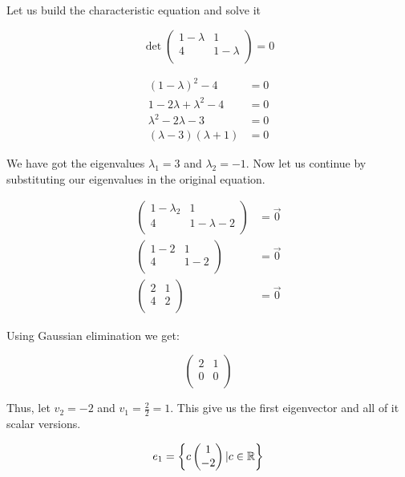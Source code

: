 Let us build the characteristic equation and solve it

\[
    \det 
    \begin{pmatrix}
        1 - \lambda & 1 \\
        4 & 1 - \lambda \\
    \end{pmatrix}
    = 0
\]

\begin{align*}
    (1 - \lambda)^2 - 4 &= 0 \\
    1 - 2\lambda + \lambda^2 - 4 &= 0 \\
    \lambda^2 - 2\lambda - 3 &= 0 \\
    (\lambda - 3) (\lambda + 1) &= 0 
\end{align*}

We have got the eigenvalues \(\lambda_1 = 3\) and \(\lambda_2 = -1\). Now let us continue by 
substituting our eigenvalues in the original equation.

\begin{align*}
    \begin{pmatrix} 1 - \lambda_2 & 1 \\ 4 & 1 - \lambda-2 \\ \end{pmatrix} &= \vec{0} \\
    \begin{pmatrix} 1 - 2 & 1 \\ 4 & 1 - 2 \\ \end{pmatrix} &= \vec{0} \\
    \begin{pmatrix} 2 & 1 \\ 4 & 2 \\ \end{pmatrix} &= \vec{0} 
\end{align*}

Using Gaussian elimination we get: 

\[
    \begin{pmatrix} 
        2 & 1 \\ 
        0 & 0 \\ 
    \end{pmatrix} 
\]

Thus, let \(v_2 = -2\) and \(v_1 = \frac{2}{2} = 1\). This give us the first eigenvector and all of it 
scalar versions.

\[
    e_1 = \left\{ c \begin{pmatrix} 1 \\ -2 \end{pmatrix} | c \in \mathbb{R}\right\}
\]


